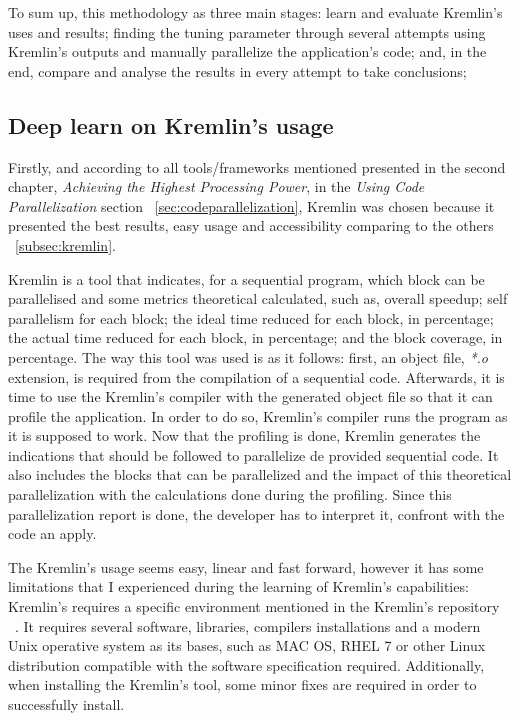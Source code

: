 To sum up, this methodology as three main stages: learn and evaluate  Kremlin's uses and results; finding the tuning parameter through several attempts using Kremlin's outputs and manually parallelize the application's code; and, in the end, compare and analyse the results in every attempt to take conclusions; 


\subsection{Deep learn on Kremlin's usage}

Firstly, and according to all tools/frameworks mentioned presented in the second chapter, \textit{Achieving the Highest Processing Power}, in the \textit{Using Code Parallelization} section ~\ref{sec:codeparallelization}, Kremlin was chosen because it presented the best results, easy usage and accessibility comparing to the others ~\ref{subsec:kremlin}.

Kremlin is a tool that indicates, for a sequential program, which block can be parallelised and some metrics theoretical calculated, such as, overall speedup; self parallelism for each block; the ideal time reduced for each block, in percentage; the actual time reduced for each block, in percentage; and the block coverage, in percentage. The way this tool was used is as it follows: first, an object file, \textit{*.o} extension, is required from the compilation of a sequential code. Afterwards, it is time to use the Kremlin's compiler with the generated object file so that it can profile the application. In order to do so, Kremlin's compiler runs the program as it is supposed to work. Now that the profiling is done, Kremlin generates the indications that should be followed to parallelize de provided sequential code. It also includes the blocks that can be parallelized and the impact of this theoretical parallelization with the calculations done during the profiling. Since this parallelization report is done, the developer has to interpret it, confront with the code an apply.

The Kremlin's usage seems easy, linear and fast forward, however it has some limitations that I experienced during the learning of Kremlin's capabilities: Kremlin's requires a specific environment mentioned in the Kremlin's repository ~\cite{KremlinRep}. It requires several software, libraries, compilers installations and a modern Unix operative system as its bases, such as MAC OS, RHEL 7 or other Linux distribution compatible with the software specification required. Additionally, when installing the Kremlin's tool, some minor fixes are required in order to successfully install.

